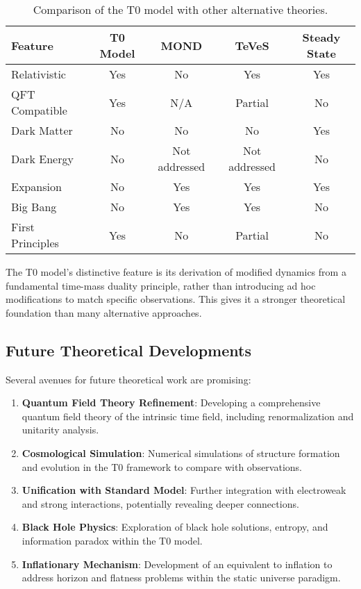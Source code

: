 \documentclass[12pt,a4paper]{article} %
\begin{document}
	\begin{table}[ht]
		\centering
		\caption{Comparison of the T0 model with other alternative theories.}
		\label{tab:theory_comparison}
		\begin{tabular}{lcccc} %
			\hline
			\textbf{Feature} & \textbf{T0 Model} & \textbf{MOND} & \textbf{TeVeS} & \textbf{Steady State} \\
			\hline
			Relativistic & Yes & No & Yes & Yes \\
			QFT Compatible & Yes & N/A & Partial & No \\
			Dark Matter & No & No & No & Yes \\
			Dark Energy & No & Not addressed & Not addressed & No \\
			Expansion & No & Yes & Yes & Yes \\
			Big Bang & No & Yes & Yes & No \\
			First Principles & Yes & No & Partial & No \\
			\hline
		\end{tabular}
	\end{table}
	
	The T0 model's distinctive feature
	is its derivation of modified dynamics
	from a fundamental time-mass duality principle,
	rather than introducing ad hoc modifications to match specific observations. 
	This gives it a stronger theoretical foundation
	than many alternative approaches.
	
	\subsection{Future Theoretical Developments}
	\label{subsec:future_developments}
	
	Several avenues for future theoretical work are promising:
	\begin{enumerate}
		\item \textbf{Quantum Field Theory Refinement}:
		Developing a comprehensive quantum field theory
		of the intrinsic time field,
		including renormalization and unitarity analysis.
		\item \textbf{Cosmological Simulation}:
		Numerical simulations of structure formation
		and evolution in the T0 framework
		to compare with observations.
		\item \textbf{Unification with Standard Model}:
		Further integration with electroweak and strong interactions,
		potentially revealing deeper connections.
		\item \textbf{Black Hole Physics}:
		Exploration of black hole solutions,
		entropy, and information paradox within the T0 model.
		\item \textbf{Inflationary Mechanism}:
		Development of an equivalent to inflation
		to address horizon and flatness problems
		within the static universe paradigm.
	\end{enumerate}
	
\end{document}
